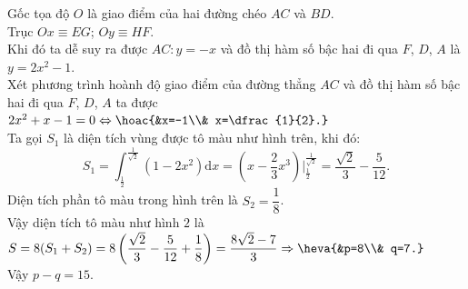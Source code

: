 \begin{bt}
{\begin{center}
		\end{center}
		Gốc tọa độ $O$ là  giao điểm của hai đường chéo $AC$ và $BD$.\\
		Trục $Ox\equiv  EG$; $Oy\equiv HF$.\\
		Khi đó ta dễ suy ra được $AC\colon y=-x$ và đồ thị hàm số bậc hai đi qua $F$, $D$, $A$ là  $y=2x^2-1$.\\
		Xét phương trình hoành độ giao điểm của đường thẳng $AC$ và đồ thị hàm số bậc hai đi qua $F$, $D$, $A$ ta được $2x^2+x-1=0\Leftrightarrow\hoac{&x=-1\\& x=\dfrac{1}{2}.}$  \\
		Ta gọi $S_1$ là diện tích vùng được tô màu như  hình trên, khi đó:\\
		$$S_1=\displaystyle\int_{\frac{1}{2}}^{\frac{1}{\sqrt{2}}}\left(1-2 x^2\right)  \mathrm{d}x=\left(x-\dfrac{2}{3} x^3\right)\bigg|_{\frac{1}{2}}^{\frac{1}{\sqrt{2}}} =\dfrac{\sqrt{2}}{3}-\dfrac{5}{12}.$$
		Diện tích phần tô màu trong hình trên là $S_2=\dfrac{1}{8}$.\\ 
		Vậy diện tích tô màu như hình  $2$ là $S=8(S_1+S_2)=8\left(\dfrac{\sqrt{2}}{3}-\dfrac{5}{12}+\dfrac{1}{8}\right)=\dfrac{8\sqrt{2}-7}{3}\Rightarrow\heva{&p=8\\& q=7.}$ \\
	 Vậy $p-q=15$.}
\end{bt}


